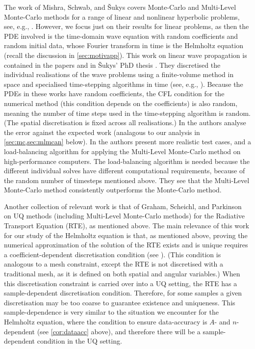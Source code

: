 The work of Mishra, Schwab, and \v{S}ukys covers Monte-Carlo and Multi-Level Monte-Carlo methods for a range of linear and nonlinear hyperbolic problems, see, e.g., \cite{Su:14}. However, we focus just on their results for linear problems, as then the PDE involved is the time-domain wave equation with random coefficients and random initial data, whose Fourier transform in time is the Helmholtz equation (recall the discussion in \cref{sec:motivapp}). This work on linear wave propagation is contained in the papers \cite{SuMiSc:13,MiScSu:16} and in \v{S}ukys' PhD thesis \cite{Su:14}. They discretised the individual realisations of the wave problems using a finite-volume method in space and specialised time-stepping algorithms in time (see, e.g., \cite[Section 3.1]{MiScSu:16}). Because the PDEs in these works have random coefficients, the CFL condition for the numerical method (this condition depends on the coefficients) is also random, meaning the number of time steps used in the time-stepping algorithm is random. (The spatial discretisation is fixed across all realisations.) In \cite{SuMiSc:13} the authors analyse the error against the expected work (analagous to our analysis in \cref{sec:mc,sec:mlmcan} below). In \cite{MiScSu:16} the authors present more realistic test cases, and a load-balancing algorithm for applying the Multi-Level Monte-Carlo method on high-performance computers. The load-balancing algorithm is needed because the different individual solves have different computational requirements, because of the random number of timesteps mentioned above. They see that the Multi-Level Monte-Carlo method consistently outperforms the Monte-Carlo method.

Another collection of relevant work is that of Graham, Scheichl, and Parkinson \cite{GrPaSc:18,Pa:18,GrPaSc:19} on UQ methods (including Multi-Level Monte-Carlo methods) for the Radiative Transport Equation (RTE), as mentioned above. The main relevance of this work for our study of the Helmholtz equation is that, as mentioned above, proving the numerical approximation of the solution of the RTE exists and is unique requires a coefficient-dependent discretisation condition (see \cite[Theorem 4.12]{GrPaSc:19}). (This condition is analogous to a mesh constraint, except the RTE is not discretised with a traditional mesh, as it is defined on both spatial and angular variables.) When this discretisation constraint is carried over into a UQ setting, the RTE has a sample-dependent discretisation condition. Therefore, for some samples a given discretisation may be too coarse to guarantee existence and uniqueness. This sample-dependence is very similar to the situation we encounter for the Helmholtz equation, where the condition to ensure data-accuracy is $A$- and $n$-dependent (see \cref{cor:dataacc} above), and therefore there will be a sample-dependent condition in the UQ setting.

